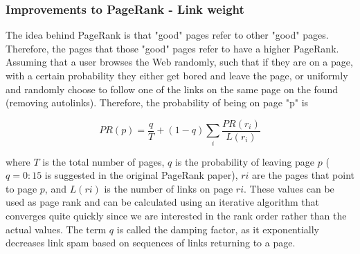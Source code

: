\subsubsection{Improvements to PageRank - Link weight}

The idea behind PageRank is that "good" pages refer to other "good" pages. Therefore, the pages that those "good" pages refer to have a higher PageRank. Assuming that a user browses the Web randomly, such that if they are on a page, with a certain probability they either get bored and leave the page, or uniformly and randomly choose to follow one of the links on the same page on the found (removing autolinks). Therefore, the probability of being on page "p" is

\begin{equation} 
	\label{eqn:ecuacionWLRank1} 
	PR(p) = \frac{q}{T} + (1 - q) \sum_{i} \frac{PR(r_i)}{L(r_i)} 
\end{equation}

where $T$ is the total number of pages, $q$ is the probability of
leaving page $p$ ($q = 0:15$ is suggested in the original PageRank paper), $ri$ are the pages that point to page $p$, and $L(ri)$ is the
number of links on page $ri$. These values can be used as page rank and
can be calculated using an iterative algorithm that converges quite quickly since we are interested in the rank order rather than the actual values. The term $q$ is called the damping factor, as it exponentially decreases link spam based on sequences of links returning to a page.

